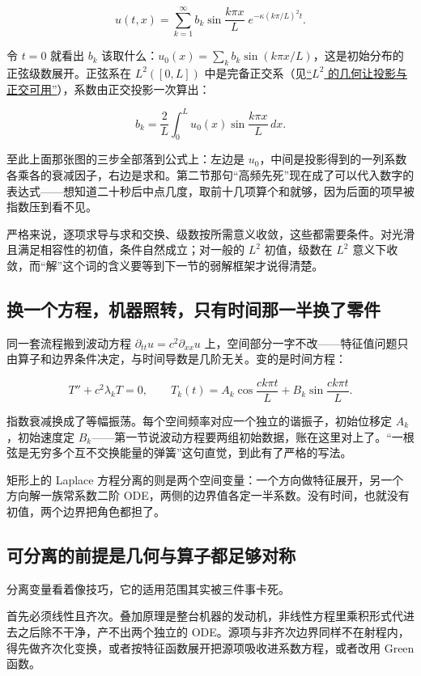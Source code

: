 \[
u(t,x)=\sum_{k=1}^{\infty}b_k\sin\frac{k\pi x}{L}\;e^{-\kappa(k\pi/L)^2t}.
\]

令 \(t=0\) 就看出 \(b_k\) 该取什么：\(u_0(x)=\sum_kb_k\sin(k\pi x/L)\)，这是初始分布的正弦级数展开。正弦系在 \(L^2([0,L])\) 中是完备正交系（见\hyperref[sec:12-Real-Analysis-Support/07-Lp-Spaces-and-Function-Geometry/03]{``\(L^2\) 的几何让投影与正交可用''}），系数由正交投影一次算出：

\[
b_k=\frac{2}{L}\int_0^Lu_0(x)\sin\frac{k\pi x}{L}\,dx .
\]

至此上面那张图的三步全部落到公式上：左边是 \(u_0\)，中间是投影得到的一列系数各乘各的衰减因子，右边是求和。第二节那句``高频先死''现在成了可以代入数字的表达式——想知道二十秒后中点几度，取前十几项算个和就够，因为后面的项早被指数压到看不见。

严格来说，逐项求导与求和交换、级数按所需意义收敛，这些都需要条件。对光滑且满足相容性的初值，条件自然成立；对一般的 \(L^2\) 初值，级数在 \(L^2\) 意义下收敛，而``解''这个词的含义要等到下一节的弱解框架才说得清楚。

\subsection{换一个方程，机器照转，只有时间那一半换了零件}

同一套流程搬到波动方程 \(\partial_{tt}u=c^2\partial_{xx}u\) 上，空间部分一字不改——特征值问题只由算子和边界条件决定，与时间导数是几阶无关。变的是时间方程：

\[
T''+c^2\lambda_kT=0,
\qquad
T_k(t)=A_k\cos\frac{ck\pi t}{L}+B_k\sin\frac{ck\pi t}{L}.
\]

指数衰减换成了等幅振荡。每个空间频率对应一个独立的谐振子，初始位移定 \(A_k\)，初始速度定 \(B_k\)——第一节说波动方程要两组初始数据，账在这里对上了。``一根弦是无穷多个互不交换能量的弹簧''这句直觉，到此有了严格的写法。

矩形上的 Laplace 方程分离的则是两个空间变量：一个方向做特征展开，另一个方向解一族常系数二阶 ODE，两侧的边界值各定一半系数。没有时间，也就没有初值，两个边界把角色都担了。

\subsection{可分离的前提是几何与算子都足够对称}

分离变量看着像技巧，它的适用范围其实被三件事卡死。

首先必须线性且齐次。叠加原理是整台机器的发动机，非线性方程里乘积形式代进去之后除不干净，产不出两个独立的 ODE。源项与非齐次边界同样不在射程内，得先做齐次化变换，或者按特征函数展开把源项吸收进系数方程，或者改用 Green 函数。

